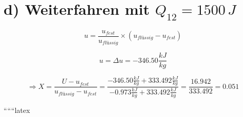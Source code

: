 \section*{d) Weiterfahren mit $Q_{12} = 1500 \, J$}

\[
u = \frac{u_{fest}}{u_{flüssig}} \times (u_{flüssig} - u_{fest})
\]

\[
u = \Delta u = -346.50 \frac{kJ}{kg}
\]

\[
\Rightarrow X = \frac{U - u_{fest}}{u_{flüssig} - u_{fest}} = \frac{-346.50 \frac{kJ}{kg} + 333.492 \frac{kJ}{kg}}{-0.973 \frac{kJ}{kg} + 333.492 \frac{kJ}{kg}} = \frac{16.942}{333.492} = 0.051
\]

``````latex